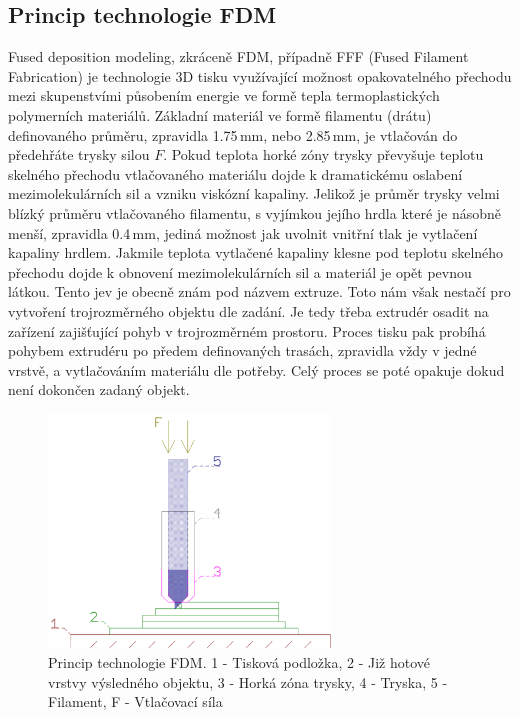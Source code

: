 \subsection{Princip technologie FDM}
Fused deposition modeling, zkráceně FDM, případně FFF (Fused Filament Fabrication) je technologie 3D tisku využívající možnost opakovatelného přechodu mezi skupenstvími působením energie ve formě tepla termoplastických polymerních materiálů. Základní materiál ve formě filamentu (drátu) definovaného průměru, zpravidla 1.75\,mm, nebo 2.85\,mm, je vtlačován do předehřáte trysky silou $F$. Pokud teplota horké zóny trysky převyšuje teplotu skelného přechodu vtlačovaného materiálu dojde k dramatickému oslabení mezimolekulárních sil a vzniku viskózní kapaliny. Jelikož je průměr trysky velmi blízký průměru vtlačovaného filamentu, s vyjímkou jejího hrdla které je násobně menší, zpravidla 0.4\,mm, jediná možnost jak uvolnit vnitřní tlak je vytlačení kapaliny hrdlem. Jakmile teplota vytlačené kapaliny klesne pod teplotu skelného přechodu dojde k obnovení mezimolekulárních sil a materiál je opět pevnou látkou. Tento jev je obecně znám pod názvem extruze.
Toto nám však nestačí pro vytvoření trojrozměrného objektu dle zadání. Je tedy třeba extrudér osadit na zařízení zajišťující pohyb v trojrozměrném prostoru.
Proces tisku pak probíhá pohybem extrudéru po předem definovaných trasách, zpravidla vždy v jedné vrstvě, a vytlačováním materiálu dle potřeby. Celý proces se poté opakuje dokud není dokončen zadaný objekt.
\begin{figure}[h!]
\begin{center}
\includegraphics[width=7.5cm]{pics/fdm}
\caption{Princip technologie FDM. 1 - Tisková podložka, 2 - Již hotové vrstvy výsledného objektu, 3 - Horká zóna trysky, 4 - Tryska, 5 - Filament, F - Vtlačovací síla}
\end{center}
\end{figure}


